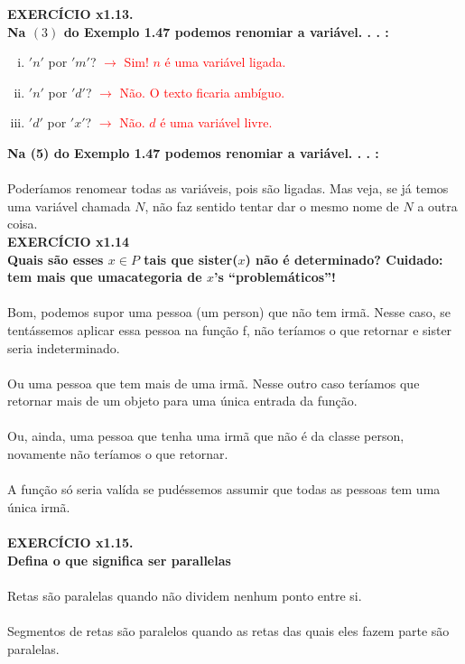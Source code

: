 \documentclass[a4paper, 12pt]{article}
\begin{document}
\noindent \textbf{EXERCÍCIO x1.13. \\
Na $(3)$ do Exemplo 1.47 podemos renomiar a variável. . . :}
\begin{enumerate}[(i)]
    \item $'n'$ por $'m'$? \textcolor{red}{$\rightarrow$ Sim! $n$ é uma variável ligada.}
    \item $'n'$ por $'d'$? \textcolor{red}{$\rightarrow$ Não. O texto ficaria ambíguo.}
    \item $'d'$ por $'x'$? \textcolor{red}{$\rightarrow$ Não. $d$ é uma variável livre.}
\end{enumerate}

\noindent \textbf{Na (5) do Exemplo 1.47 podemos renomiar a variável. . . :} \\ \\
Poderíamos renomear todas as variáveis, pois são ligadas. Mas veja, se já temos uma variável chamada $N$, não faz sentido tentar dar o mesmo nome de $N$ a outra coisa. \\

\noindent \textbf{EXERCÍCIO x1.14 \\
Quais são esses $x \in P$ tais que sister($x$) não é determinado? Cuidado: tem mais que umacategoria de $x$'s “problemáticos”!} \\ \\
Bom, podemos supor uma pessoa (um person) que não tem irmã. Nesse caso, se tentássemos aplicar essa pessoa na função f, não teríamos o que retornar e sister seria indeterminado. \\ \\
Ou uma pessoa que tem mais de uma irmã. Nesse outro caso teríamos que retornar mais de um objeto para uma única entrada da função. \\ \\
Ou, ainda, uma pessoa que tenha uma irmã que não é da classe person, novamente não teríamos o que retornar. \\ \\
A função só seria valída se pudéssemos assumir que todas as pessoas tem uma única irmã. \\ \\

\noindent \textbf{EXERCÍCIO x1.15. \\
Defina o que significa ser parallelas} \\ \\
Retas são paralelas quando não dividem nenhum ponto entre si.\\ \\
Segmentos de retas são paralelos quando as retas das quais eles fazem parte são paralelas. \\ \\
\end{document}
